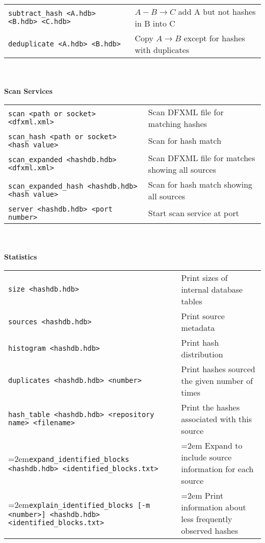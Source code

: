 \begin{small}
\begin{footnotesize}
\begin{tabular}{p{3.6 in} p{3.0 in}}
\texttt{subtract\_hash <A.hdb> <B.hdb> <C.hdb>} & $A - B \rightarrow C$ add A but not hashes in B into C\\
\texttt{deduplicate <A.hdb> <B.hdb>} & Copy $A \rightarrow B$ except for hashes with duplicates \\
\end{tabular}
\\
\\
\textbf{Scan Services} \\
\begin{tabular}{p{3.6 in} p{3.0 in}}
\texttt{scan <path or socket> <dfxml.xml>} & Scan DFXML file for matching hashes \\
\texttt{scan\_hash <path or socket> <hash value>} & Scan for hash match \\
\texttt{scan\_expanded <hashdb.hdb> <dfxml.xml>} & Scan DFXML file for matches showing all sources\\
\texttt{scan\_expanded\_hash <hashdb.hdb> <hash value>} & Scan for hash match showing all sources\\
\texttt{server <hashdb.hdb> <port number>} & Start scan service at port\\
\end{tabular}
\\
\\
\textbf{Statistics}\\
\begin{tabular}{p{3.6 in} p{3.0 in}}
\texttt{size <hashdb.hdb>} & Print sizes of internal database tables \\
\texttt{sources <hashdb.hdb>} & Print source metadata \\
\texttt{histogram <hashdb.hdb>} & Print hash distribution \\
\texttt{duplicates <hashdb.hdb> <number>} & Print hashes sourced the given number of times \\
\texttt{hash\_table <hashdb.hdb> <repository name> <filename>} & Print the hashes associated with this source\\
\hangindent=2em\texttt{expand\_identified\_blocks <hashdb.hdb> <identified\_blocks.txt>} & \hangindent=2em Expand to include source information for each source \\
\hangindent=2em\texttt{explain\_identified\_blocks [-m <number>] <hashdb.hdb> <identified\_blocks.txt>} & \hangindent=2em Print information about less frequently observed hashes\\
\end{tabular}
\\
\\

\end{footnotesize}
\end{small}
